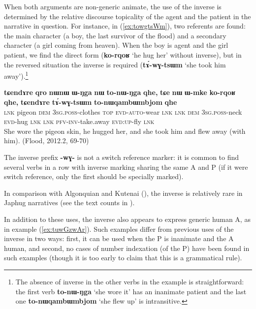 \documentclass[oneside,a4paper,11pt]{article}
\newcommand{\ipa}[1]{\textbf{\phon\mbox{#1}}} %
\newcommand{\refb}[1]{(\ref{#1})}
\begin{document}
 
When both arguments are non-generic animate, the use of the inverse is determined by the relative discourse topicality of the agent and the patient in the narrative in question. For instance, in \refb{ex:towgtsWm}, two referents are found: the main character (a boy, the last survivor of the flood) and a secondary character (a girl coming from heaven). When the boy is agent and the girl patient, we find the direct form (\ipa{ko-rqoʁ}  `he hug her' without inverse), but in the reversed situation the inverse is required (\ipa{tɤ́-wɣ-tsɯm} `she took him away').\footnote{The absence of inverse in the other verbs in the example is straightforward: the first verb 	\ipa{to-nɯ-ŋga}  `she wore it' has an inanimate patient and the last one \ipa{to-nɯqambɯmbjom}  `she flew up' is intransitive. }

 \begin{exe}
\ex \label{ex:towgtsWm} 
\gll
\ipa{tɕendɤre} 	\ipa{qro} 	\ipa{nɯnɯ} 	\ipa{ɯ-ŋga} 	\ipa{nɯ} 	\ipa{to-nɯ-ŋga} 	\ipa{qhe,}  \ipa{tɕe} 	\ipa{nɯ} 	\ipa{ɯ-mke} 	\ipa{ko-rqoʁ} 	\ipa{qhe,} \ipa{tɕendɤre} 	\ipa{tɤ́-wɣ-tsɯm} 	\ipa{to-nɯqambɯmbjom} 	\ipa{qhe} \\
\textsc{lnk} pigeon \textsc{dem} \textsc{3sg.poss}-clothes \textsc{top} \textsc{evd-auto}-wear \textsc{lnk} \textsc{lnk} \textsc{dem} \textsc{3sg.poss}-neck \textsc{evd}-hug \textsc{lnk} \textsc{lnk} \textsc{pfv-inv}-take.away \textsc{evd:up}-fly \textsc{lnk} \\
\glt She wore the pigeon skin, he hugged her, and she took him and flew away (with him). (Flood, 2012.2, 69-70)
\end{exe}

The inverse prefix \ipa{-wɣ-} is not a switch reference marker: it is common to find several verbs in a row with inverse marking sharing the same A and P (if it were switch reference, only the first should be specially marked).

In comparison with Algonquian and Kutenai (\citealt{dryer94inverse}), the inverse is relatively rare in Japhug narratives (see the text counts in \citealt{jacques10inverse}).

In addition to these uses, the inverse also appears to express generic human A, as in example \refb{ex:tuwGzwAr}. Such examples differ from previous uses of the inverse in two ways: first, it can be used when the P is inanimate and the A human, and second, no cases of number indexation (of the P) have been found in such examples (though it is too early to claim that this is a grammatical rule). 
\end{document}
